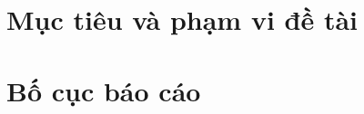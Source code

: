 \documentclass[../BTL.tex]{subfiles}
\begin{document}
\section{Mục tiêu và phạm vi đề tài}
\label{section:1.2}


\section{Bố cục báo cáo}
\label{section:1.4}
\end{document}
